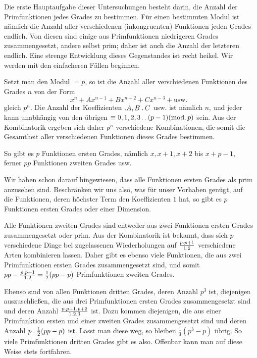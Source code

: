 Die erste Hauptaufgabe dieser Untersuchungen besteht darin, die Anzahl der Primfunktionen jedes Grades zu bestimmen. Für einen bestimmten Modul ist nämlich die Anzahl aller verschiedenen (inkongruenten) Funktionen jeden Grades endlich. Von diesen sind einige aus Primfunktionen niedrigeren Grades zusammengesetzt, andere selbst prim; daher ist auch die Anzahl der letzteren endlich. Eine strenge Entwicklung dieses Gegenstandes ist recht heikel. Wir werden mit den einfacheren Fällen beginnen.

Setzt man den Modul $=p$, so ist die Anzahl aller verschiedenen Funktionen des Grades $n$ von der Form
\[
x^n+Ax^{n-1}+Bx^{n-2}+Cx^{n-3}+\text{usw.}
\]
gleich $p^n$. Die Anzahl der Koeffizienten $\mathbin{.} A,B\mathbin{.} C$ usw. ist nämlich $n$, und jeder kann unabhängig von den übrigen $\equiv0,1,2,3\mathinner{.\,.}(p-1)(\mathrm{mod.}\,p)$ sein. Aus der Kombinatorik ergeben sich daher $p^n$ verschiedene Kombinationen, die somit die Gesamtheit aller verschiedenen Funktionen dieses Grades bestimmen.

So gibt es $p$ Funktionen ersten Grades, nämlich $x,x+1,x+2$ bis $x+p-1$, ferner $pp$ Funktionen zweiten Grades usw.

Wir haben schon darauf hingewiesen, dass alle Funktionen ersten Grades als prim anzusehen sind. Beschränken wir uns also, was für unser Vorhaben genügt, auf die Funktionen, deren höchster Term den Koeffizienten $1$ hat, so gibt es $p$ Funktionen ersten Grades oder einer Dimension.

Alle Funktionen zweiten Grades sind entweder aus zwei Funktionen ersten Grades zusammengesetzt oder prim. Aus der Kombinatorik ist bekannt, dass sich $p$ verschiedene Dinge bei zugelassenen Wiederholungen auf $\frac{p\mathbin{.} p+1}{1\mathbin{.}2}$ verschiedene Arten kombinieren lassen. Daher gibt es ebenso viele Funktionen, die aus zwei Primfunktionen ersten Grades zusammengesetzt sind, und somit $pp-\frac{p\mathbin{.} p+1}{1\mathbin{.}2}=\frac12(pp-p)$ Primfunktionen zweiten Grades.

Ebenso sind von allen Funktionen dritten Grades, deren Anzahl $p^3$ ist, diejenigen auszuschließen, die aus drei Primfunktionen ersten Grades zusammengesetzt sind und deren Anzahl $\frac{p\mathbin{.} p+1\mathbin{.} p+2}{1\mathbin{.}2\mathbin{.}3}$ ist. Dazu kommen diejenigen, die aus einer Primfunktion ersten und einer zweiten Grades zusammengesetzt sind und deren Anzahl $p\mathbin{.}\frac12(pp-p)$ ist. Lässt man diese weg, so bleiben $\frac13(p^3-p)$ übrig. So viele Primfunktionen dritten Grades gibt es also. Offenbar kann man auf diese Weise stets fortfahren.

